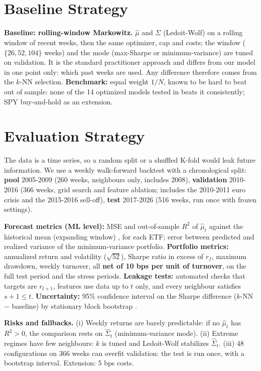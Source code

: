 \documentclass[11pt,a4paper]{article}
\newcommand{\changed}[1]{#1}
\begin{document}
\section{Baseline Strategy}
\textbf{Baseline: rolling-window Markowitz.} $\hat\mu$ and $\hat\Sigma$ (Ledoit-Wolf) on \changed{a rolling window of recent weeks}, then the same optimizer,
cap and costs\changed{; the window ($\{26, 52, 104\}$ weeks) and the mode (max-Sharpe or minimum-variance) are tuned on validation}. It is the standard practitioner approach and differs from our model in one point only: which past
weeks are used. Any difference therefore comes from the $k$-NN selection. \textbf{Benchmark:} equal weight $1/N$, known
to be hard to beat out of sample: none of the 14 optimized models tested in \cite{demiguel} beats it consistently\changed{; SPY buy-and-hold as an extension}.

\section{Evaluation Strategy}
The data is a time series, so a random split or a shuffled K-fold would leak future information. We use a
weekly walk-forward backtest with a chronological split: \textbf{pool} 2005-2009 (260 weeks, neighbours only, includes 2008),
\textbf{validation} 2010-2016 (366 weeks, \changed{grid search and feature ablation}; includes the 2010-2011 euro crisis and the 2015-2016 sell-off),
\textbf{test} 2017-2026 (516 weeks, run once with frozen settings).

\textbf{Forecast metrics (ML level):} MSE and out-of-sample $R^2$ of $\hat\mu_t$ against the \changed{historical mean (expanding window)} \cite{campbell}\changed{, for each ETF};
error between predicted and realized variance of the minimum-variance portfolio.
\textbf{Portfolio metrics:} annualized return and volatility ($\sqrt{52}$), Sharpe ratio in excess of $r_f$, maximum drawdown,
weekly turnover, all \textbf{net of 10 bps per unit of turnover}, on the full test period and the stress periods.
\textbf{Leakage tests:} automated checks that targets are $r_{t+1}$, features use data up to $t$ only, and every neighbour satisfies $s+1\le t$.
\changed{\textbf{Uncertainty:} 95\% confidence interval on the Sharpe difference ($k$-NN $-$ baseline) by stationary block bootstrap \cite{politis}.}

\textbf{Risks and fallbacks.} (i) Weekly returns are barely predictable: if no $\hat\mu_t$ has $R^2>0$, the comparison rests on $\hat\Sigma_t$ (minimum-variance mode). (ii) Extreme regimes have few neighbours: $k$ is tuned and Ledoit-Wolf stabilizes $\hat\Sigma_t$. (iii) 48 configurations on 366 weeks can overfit validation: the test is run once, with a bootstrap interval. Extension: 5 bps costs.
\end{document}
